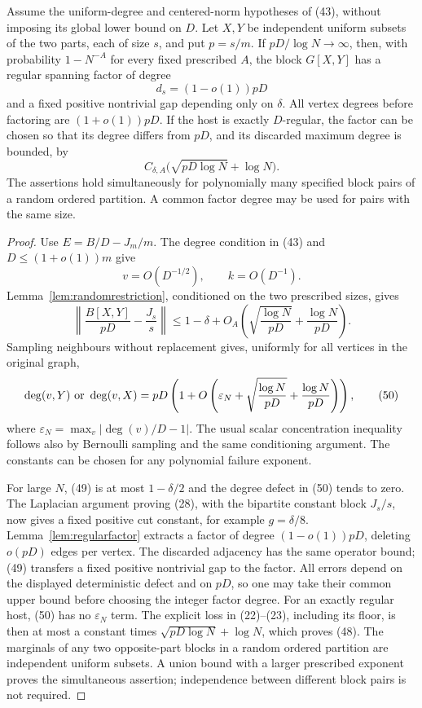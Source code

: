 \begin{lemma}
\label{lem:randomblockfactor}
Assume the uniform-degree and centered-norm hypotheses
of (43), without imposing its global lower bound on \(D\).
Let \(X,Y\) be independent uniform subsets of the two parts,
each of size \(s\), and put \(p=s/m\).
If \(pD/\log N\to\infty\), then, with probability
\(1-N^{-A}\) for every fixed prescribed \(A\), the block
\(G[X,Y]\) has a regular spanning factor of degree
\[
 d_s=(1-o(1))pD
\]
and a fixed positive nontrivial gap depending only on \(\delta\).
All vertex degrees before factoring are \((1+o(1))pD\).
If the host is exactly \(D\)-regular, the factor can be chosen
so that its degree differs from \(pD\), and its discarded
maximum degree is bounded, by
\[
 C_{\delta,A}\bigl(\sqrt{pD\log N}+\log N\bigr).
 \tag{48}
\]
The assertions hold simultaneously for polynomially many
specified block pairs of a random ordered partition.
A common factor degree may be used for pairs with the same size.
\end{lemma}
\begin{proof}
Use \(E=B/D-J_m/m\).
The degree condition in (43) and \(D\leq(1+o(1))m\)
give
\[
 v=O(D^{-1/2}),\qquad k=O(D^{-1}).
\]
Lemma~\ref{lem:randomrestriction}, conditioned on the two
prescribed sizes, gives
\[
 \left\|\frac{B[X,Y]}{pD}-\frac{J_s}{s}\right\|
 \leq1-\delta+
        O_A\left(\sqrt{\frac{\log N}{pD}}
                        +\frac{\log N}{pD}\right).
 \tag{49}
\]
Sampling neighbours without replacement gives, uniformly for
all vertices in the original graph,
\[
 \deg(v,Y)\ \hbox{or}\ \deg(v,X)
 =pD\left(1+O\left(\varepsilon_N+
       \sqrt{\frac{\log N}{pD}}+\frac{\log N}{pD}\right)\right),
 \tag{50}
\]
where \(\varepsilon_N=\max_v|\deg(v)/D-1|\).
The usual scalar concentration inequality follows also by
Bernoulli sampling and the same conditioning argument.
The constants can be chosen for any polynomial failure exponent.

For large \(N\), (49) is at most \(1-\delta/2\) and the
degree defect in (50) tends to zero.
The Laplacian argument proving (28), with the bipartite
constant block \(J_s/s\), now gives a fixed positive cut
constant, for example \(g=\delta/8\).
Lemma~\ref{lem:regularfactor} extracts a factor of degree
\((1-o(1))pD\), deleting \(o(pD)\) edges per vertex.
The discarded adjacency has the same operator bound;
(49) transfers a fixed positive nontrivial gap to the factor.
All errors depend on the displayed deterministic defect and
on \(pD\), so one may take their common upper bound before
choosing the integer factor degree.
For an exactly regular host, (50) has no \(\varepsilon_N\)
term. The explicit loss in (22)--(23), including its floor,
is then at most a constant times
\(\sqrt{pD\log N}+\log N\), which proves (48).
The marginals of any two opposite-part blocks in a random
ordered partition are independent uniform subsets.
A union bound with a larger prescribed exponent proves the
simultaneous assertion; independence between different block
pairs is not required.
\end{proof}

